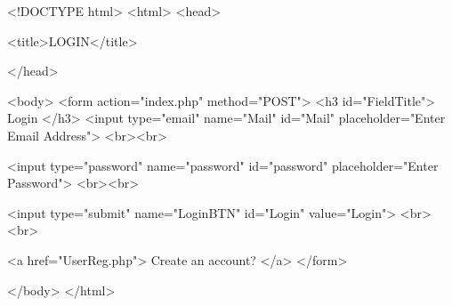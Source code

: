 <!DOCTYPE html>
<html>
	<head>

		<title>LOGIN</title>

	</head>

	<body>
		<form action="index.php" method="POST">
			<h3 id="FieldTitle"> Login </h3>
			<input type="email" name="Mail" id="Mail" placeholder="Enter Email Address">
			<br><br>

			<input type="password" name="password" id="password" placeholder="Enter Password">
			<br><br>

			<input type="submit" name="LoginBTN" id="Login" value="Login">
			<br><br>

			<a href="UserReg.php"> Create an account? </a>
		</form>

	</body>
</html>